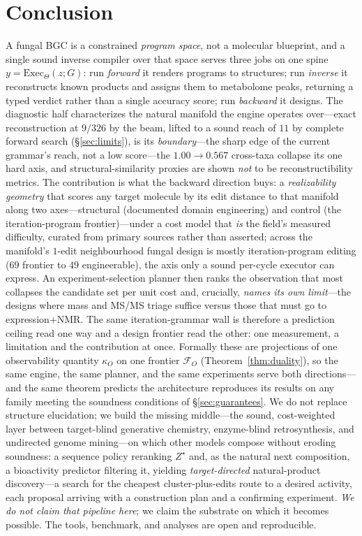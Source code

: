 \documentclass[11pt]{article}
\theoremstyle{definition}
\begin{document}
\section{Conclusion}

A fungal BGC is a constrained \emph{program space}, not a molecular blueprint, and a single sound
inverse compiler over that space serves three jobs on one spine $y=\mathrm{Exec}_{\Theta}(z;G)$: run
\emph{forward} it renders programs to structures; run \emph{inverse} it reconstructs known products
and assigns them to metabolome peaks, returning a typed verdict rather than a single accuracy score;
run \emph{backward} it designs. The diagnostic half characterizes the natural manifold the engine
operates over---exact reconstruction at $9/326$ by the beam, lifted to a sound reach of $11$ by complete forward search (\S\ref{sec:limits}), is its \emph{boundary}---the sharp edge of the current grammar's reach, not a low score---the
$1.00\!\to\!0.567$ cross-taxa collapse its one hard axis, and structural-similarity proxies are shown
\emph{not} to be reconstructibility metrics. The contribution is what the backward direction buys: a
\emph{realizability geometry} that scores any target molecule by its edit distance to that manifold
along two axes---structural (documented domain engineering) and control (the iteration-program
frontier)---under a cost model that \emph{is} the field's measured difficulty, curated from primary
sources rather than asserted; across the manifold's $1$-edit neighbourhood fungal design is mostly
iteration-program editing ($69$ frontier to $49$ engineerable), the axis only a sound per-cycle
executor can express. An experiment-selection planner then ranks the observation that most collapses
the candidate set per unit cost and, crucially, \emph{names its own limit}---the designs where mass
and MS/MS triage suffice versus those that must go to expression$+$NMR. The same iteration-grammar
wall is therefore a prediction ceiling read one way and a design frontier read the other: one
measurement, a limitation and the contribution at once. Formally these are projections of one
observability quantity $\kappa_O$ on one frontier $\mathcal{F}_O$ (Theorem~\ref{thm:duality}), so the
same engine, the same planner, and the same experiments serve both directions---and the same theorem
predicts the architecture reproduces its results on any family meeting the soundness conditions of
\S\ref{sec:guarantees}. We do not replace structure elucidation; we
build the missing middle---the sound, cost-weighted layer between target-blind generative chemistry,
enzyme-blind retrosynthesis, and undirected genome mining---on which other models compose without
eroding soundness: a sequence policy reranking $Z^{\star}$ and, as the natural next composition, a
bioactivity predictor filtering it, yielding \emph{target-directed} natural-product discovery---a search
for the cheapest cluster-plus-edits route to a desired activity, each proposal arriving with a
construction plan and a confirming experiment. \emph{We do not claim that pipeline here}; we claim the
substrate on which it becomes possible. The tools, benchmark, and analyses are open and reproducible.
\end{document}
